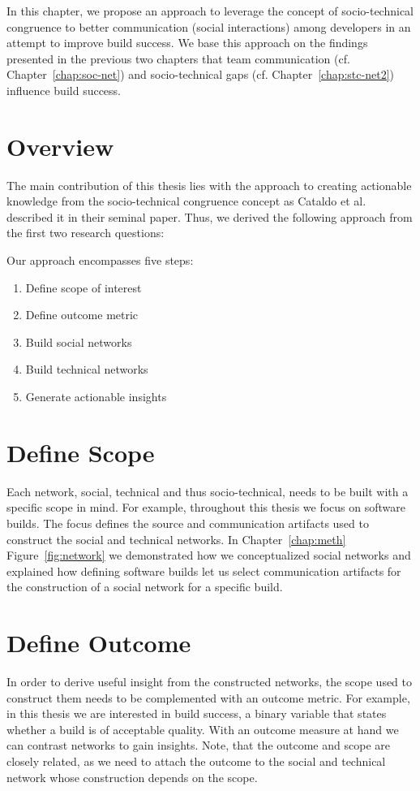 \label{chap:approach}
In this chapter, we propose an approach to leverage the concept of socio-technical congruence to better communication (social interactions) among developers in an attempt to improve build success.
We base this approach on the findings presented in the previous two chapters that team communication (cf. Chapter~\ref{chap:soc-net}) and socio-technical gaps (cf. Chapter~\ref{chap:stc-net2})  influence build success.

\section{Overview}
The main contribution of this thesis lies with the approach to creating actionable knowledge from the socio-technical congruence concept as Cataldo et al.~\cite{cataldo:cscw:2006} described it in their seminal paper.
Thus, we derived the following approach from the first two research questions:

Our approach encompasses five steps:
\begin{enumerate}
\item Define scope of interest
\item Define outcome metric
\item Build social networks
\item Build technical networks
\item Generate actionable insights
\end{enumerate}

\section{Define Scope} 
Each network, social, technical and thus socio-technical, needs to be built with a specific scope in mind.
For example, throughout this thesis we focus on software builds.
The focus defines the source and communication artifacts used to construct the social and technical networks.
In Chapter~\ref{chap:meth} Figure~\ref{fig:network} we demonstrated how we conceptualized social networks and explained how defining software builds let us select communication artifacts for the construction of a social network for a specific build.

\section{Define Outcome}
In order to derive useful insight from the constructed networks, the scope used to construct them needs to be complemented with an outcome metric.
For example, in this thesis we are interested in build success, a binary variable that states whether a build is of acceptable quality.
With an outcome measure at hand we can contrast networks to gain insights.
Note, that the outcome and scope are closely related, as we need to attach the outcome to the social and technical network whose construction depends on the scope.

